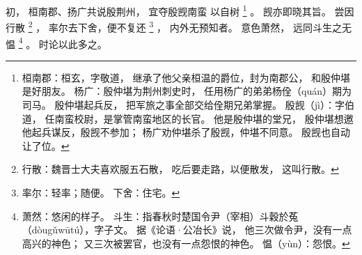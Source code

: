 
\switchcolumn*[\section{}]

初，
桓南郡、扬广共说殷荆州，
宜夺殷觊南蛮
以自树%
\footnote{%
    桓南郡：桓玄，字敬道，
            继承了他父亲桓温的爵位，封为南郡公，
            和殷仲堪是好朋友。
    杨广：殷仲堪为荆州刺史时，
          任用杨广的弟弟杨佺（quán）期为司马。
          殷仲堪起兵反，
          把军旅之事全部交给佺期兄弟掌握。
    殷觊（jì）：字伯道，
                任南蛮校尉，是掌管南蛮地区的长官。
                他是殷仲堪的堂兄，
                殷仲堪想邀他起兵谋反，殷觊不参加；
                杨广劝仲堪杀了殷觊，仲堪不同意。
                殷觊也自动让了位。
}%
。
觊亦即晓其旨。
尝因行散%
\footnote{%
    行散：魏晋士大夫喜欢服五石散，
          吃后要走路，以便散发，
          这叫行散。
}%
，
率尔去下舍，便不复还%
\footnote{%
    率尔：轻率；随便。
    下舍：住宅。
}%
，
内外无预知者。
意色萧然，
远同斗生之无愠%
\footnote{%
    萧然：悠闲的样子。
    斗生：指春秋时楚国令尹（宰相）斗穀於菟（dòugǔwūtú），字子文。
          据《论语·公冶长》说，
          他三次做令尹，没有一点高兴的神色；
          又三次被罢官，也没有一点怨恨的神色。
    愠（yùn）：怨恨。
}%
。
时论以此多之。

\switchcolumn




